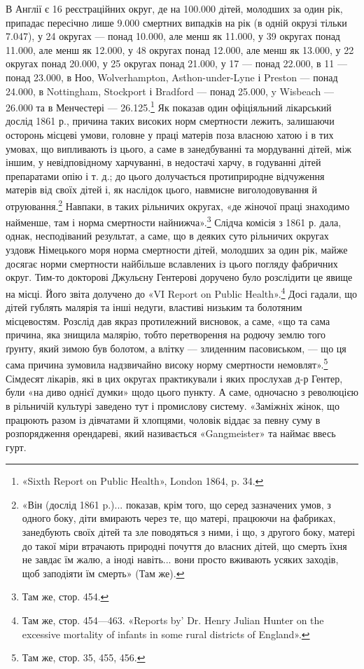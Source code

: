 \parcont{}  %
В Англії є 16 реєстраційних округ, де на 100.000 дітей, молодших
за один рік, припадає пересічно лише 9.000 смертних випадків
на рік (в одній окрузі тільки 7.047), у 24 округах — понад 10.000,
але менш як 11.000, у 39 округах понад 11.000, але менш як 12.000,
у 48 округах понад 12.000, але менш як 13.000, у 22 округах
понад 20.000, у 25 округах понад 21.000, у 17 — понад 22.000,
в 11 — понад 23.000, в Ноо, Wolverhampton, Asthon-under-Lyne
і Preston — понад 24.000, в Nottingham, Stockport і Bradford —
понад 25.000, y Wisbeach — 26.000 та в Менчестері — 26.125.\footnote{
«Sixth Report on Public Health», London 1864, p. 34.
}
Як показав один офіціяльний лікарський дослід 1861 р., причина
таких високих норм смертности лежить, залишаючи осторонь
місцеві умови, головне у праці матерів поза власною хатою і в
тих умовах, що випливають із цього, а саме в занедбуванні та
мордуванні дітей, між іншим, у невідповідному харчуванні, в
недостачі харчу, в годуванні дітей препаратами опію і т. д.;
до цього долучається протиприродне відчуження матерів від
своїх дітей і, як наслідок цього, навмисне виголодовування й
отруювання.\footnote{
«Він (дослід 1861 p.)... показав, крім того, що серед зазначених
умов, з одного боку, діти вмирають через те, що матері, працюючи на фабриках,
занедбують своїх дітей та зле поводяться з ними, і що, з другого
боку, матері до такої міри втрачають природні почуття до власних
дітей, що смерть їхня не завдає їм жалю, а іноді навіть... вони просто вживають
усяких заходів, щоб заподіяти їм смерть» (Там же).
} Навпаки, в таких рільничих округах, «де жіночої
праці знаходимо найменше, там і норма смертности найнижча».\footnote{
Там же, стор. 454.
}
Слідча комісія з 1861 р. дала, однак, несподіваний результат,
а саме, що в деяких суто рільничих округах уздовж Німецького
моря норма смертности дітей, молодших за один рік, майже
досягає норми смертности найбільше вславлених із цього погляду
фабричних округ. Тим-то докторові Джульєну Гентерові доручено
було розслідити це явище на місці. Його звіта долучено до
«VI Report on Public Health».\footnote{
Там же, стор. 454—463. «Reports by' Dr. Henry Julian Hunter
on the excessive mortality of infants in some rural districts of England».
} Досі гадали, що дітей гублять малярія
та інші недуги, властиві низьким та болотяним місцевостям.
Розслід дав якраз протилежний висновок, а саме, «що та сама
причина, яка знищила малярію, тобто перетворення на родючу
землю того ґрунту, який зимою був болотом, а влітку — злиденним
пасовиськом, — що ця сама причина зумовила надзвичайно
високу норму смертности немовлят».\footnote{
Там же, стор. 35, 455, 456.
} Сімдесят лікарів, які
в цих округах практикували і яких прослухав д-р Гентер,
були «на диво однієї думки» щодо цього пункту. А саме, одночасно
з революцією в рільничій культурі заведено тут і промислову
систему. «Заміжніх жінок, що працюють разом із дівчатами й
хлопцями, чоловік віддає за певну суму в розпорядження орендареві,
який називається «Gangmeister» та наймає ввесь гурт.
\parbreak{}  %
